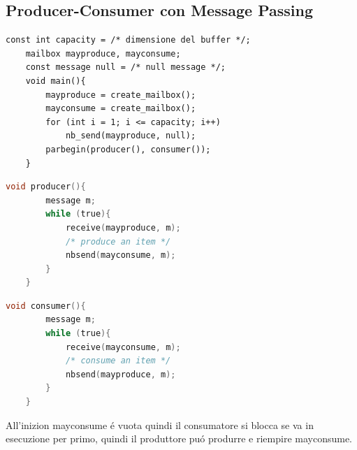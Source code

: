 \subsection{Producer-Consumer con Message Passing}
\begin{lstlisting}[languace = C]
    const int capacity = /* dimensione del buffer */;
    mailbox mayproduce, mayconsume;
    const message null = /* null message */;
    void main(){
        mayproduce = create_mailbox();
        mayconsume = create_mailbox();
        for (int i = 1; i <= capacity; i++)
            nb_send(mayproduce, null);
        parbegin(producer(), consumer());
    }
\end{lstlisting}
\begin{lstlisting}[language = C]
    void producer(){
        message m;
        while (true){
            receive(mayproduce, m);
            /* produce an item */
            nbsend(mayconsume, m);
        }
    }
\end{lstlisting}
\begin{lstlisting}[language = C]
    void consumer(){
        message m;
        while (true){
            receive(mayconsume, m);
            /* consume an item */
            nbsend(mayproduce, m);
        }
    }
\end{lstlisting}
All'inizion mayconsume é vuota quindi il consumatore si blocca se va in esecuzione per primo, quindi il produttore puó produrre e riempire mayconsume.























































